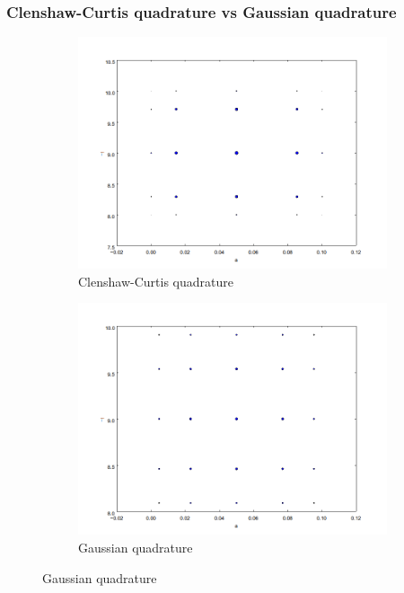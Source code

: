 \documentclass{beamer}
\begin{document}
 
 \begin{frame}
 \frametitle{Clenshaw-Curtis quadrature vs Gaussian quadrature}
 \begin{figure}        
 \begin{subfigure}[b]{0.5\textwidth}
                \includegraphics[width=\textwidth]{nodes_C.png}
                \caption{Clenshaw-Curtis quadrature}
        \end{subfigure}%
 \begin{subfigure}[b]{0.5\textwidth}
                \includegraphics[width=\textwidth]{nodes_G.png}
                \caption{Gaussian quadrature}
        \end{subfigure}
        \end{figure}
\end{frame}
 
\end{document}
